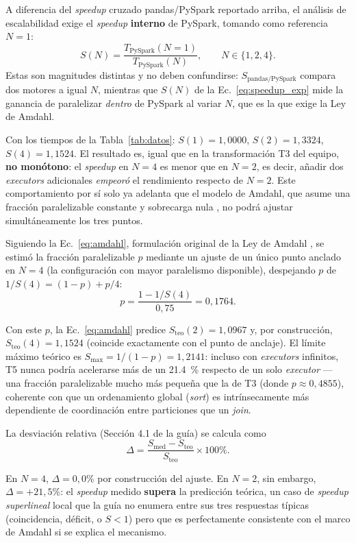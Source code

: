 \documentclass[10pt,conference]{IEEEtran}
\begin{document}
A diferencia del \textit{speedup} cruzado pandas/PySpark reportado arriba, el análisis de escalabilidad exige el \textit{speedup} \textbf{interno} de PySpark, tomando como referencia $N=1$:
\begin{equation}
S(N) = \frac{T_{\text{PySpark}}(N{=}1)}{T_{\text{PySpark}}(N)}, \qquad N \in \{1,2,4\}.
\label{eq:speedup_exp}
\end{equation}
Estas son magnitudes distintas y no deben confundirse: $S_{\text{pandas/PySpark}}$ compara dos motores a igual $N$, mientras que $S(N)$ de la Ec.~\eqref{eq:speedup_exp} mide la ganancia de paralelizar \emph{dentro} de PySpark al variar $N$, que es la que exige la Ley de Amdahl.

Con los tiempos de la Tabla~\ref{tab:datos}: $S(1)=1{,}0000$, $S(2)=1{,}3324$, $S(4)=1{,}1524$. El resultado es, igual que en la transformación T3 del equipo, \textbf{no monótono}: el \textit{speedup} en $N=4$ es menor que en $N=2$, es decir, añadir dos \textit{executors} adicionales \emph{empeoró} el rendimiento respecto de $N=2$. Este comportamiento por sí solo ya adelanta que el modelo de Amdahl, que asume una fracción paralelizable constante y sobrecarga nula \cite{hillmarty2008}, no podrá ajustar simultáneamente los tres puntos.

Siguiendo la Ec.~\eqref{eq:amdahl}, formulación original de la Ley de Amdahl \cite{amdahl1967}, se estimó la fracción paralelizable $p$ mediante un ajuste de un único punto anclado en $N=4$ (la configuración con mayor paralelismo disponible), despejando $p$ de $1/S(4) = (1-p) + p/4$:
\[
p = \frac{1 - 1/S(4)}{0{,}75} = 0{,}1764.
\]

Con este $p$, la Ec.~\eqref{eq:amdahl} predice $S_{\text{teo}}(2)=1{,}0967$ y, por construcción, $S_{\text{teo}}(4)=1{,}1524$ (coincide exactamente con el punto de anclaje). El límite máximo teórico es $S_{\max}=1/(1-p)=1{,}2141$: incluso con \textit{executors} infinitos, T5 nunca podría acelerarse más de un \SI{21.4}{\percent} respecto de un solo \textit{executor} --- una fracción paralelizable mucho más pequeña que la de T3 (donde $p\approx0{,}4855$), coherente con que un ordenamiento global (\textit{sort}) es intrínsecamente más dependiente de coordinación entre particiones que un \textit{join}.

La desviación relativa (Sección 4.1 de la guía) se calcula como
\[
\Delta = \frac{S_{\text{med}} - S_{\text{teo}}}{S_{\text{teo}}} \times 100\%.
\]

En $N=4$, $\Delta=0{,}0\%$ por construcción del ajuste. En $N=2$, sin embargo, $\Delta = +21{,}5\%$: el \textit{speedup} medido \textbf{supera} la predicción teórica, un caso de \textit{speedup superlineal} local que la guía no enumera entre sus tres respuestas típicas (coincidencia, déficit, o $S<1$) pero que es perfectamente consistente con el marco de Amdahl si se explica el mecanismo.
\end{document}
